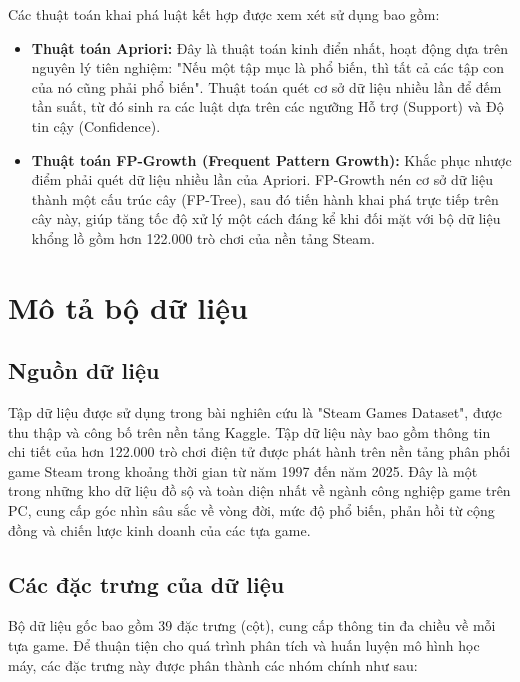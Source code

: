 \hspace{1cm} Các thuật toán khai phá luật kết hợp được xem xét sử dụng bao gồm:
\begin{itemize}
    \item \textbf{Thuật toán Apriori:} Đây là thuật toán kinh điển nhất, hoạt động dựa trên nguyên lý tiên nghiệm: "Nếu một tập mục là phổ biến, thì tất cả các tập con của nó cũng phải phổ biến". Thuật toán quét cơ sở dữ liệu nhiều lần để đếm tần suất, từ đó sinh ra các luật dựa trên các ngưỡng Hỗ trợ (Support) và Độ tin cậy (Confidence).
    \item \textbf{Thuật toán FP-Growth (Frequent Pattern Growth):} Khắc phục nhược điểm phải quét dữ liệu nhiều lần của Apriori. FP-Growth nén cơ sở dữ liệu thành một cấu trúc cây (FP-Tree), sau đó tiến hành khai phá trực tiếp trên cây này, giúp tăng tốc độ xử lý một cách đáng kể khi đối mặt với bộ dữ liệu khổng lồ gồm hơn 122.000 trò chơi của nền tảng Steam.
\end{itemize}



\newpage
\section{Mô tả bộ dữ liệu}

\subsection{Nguồn dữ liệu}
\hspace{1cm} Tập dữ liệu được sử dụng trong bài nghiên cứu là "Steam Games Dataset", được thu thập và công bố trên nền tảng Kaggle. Tập dữ liệu này bao gồm thông tin chi tiết của hơn 122.000 trò chơi điện tử được phát hành trên nền tảng phân phối game Steam trong khoảng thời gian từ năm 1997 đến năm 2025. Đây là một trong những kho dữ liệu đồ sộ và toàn diện nhất về ngành công nghiệp game trên PC, cung cấp góc nhìn sâu sắc về vòng đời, mức độ phổ biến, phản hồi từ cộng đồng và chiến lược kinh doanh của các tựa game.



\subsection{Các đặc trưng của dữ liệu}
\hspace{1cm} Bộ dữ liệu gốc bao gồm 39 đặc trưng (cột), cung cấp thông tin đa chiều về mỗi tựa game. Để thuận tiện cho quá trình phân tích và huấn luyện mô hình học máy, các đặc trưng này được phân thành các nhóm chính như sau:

